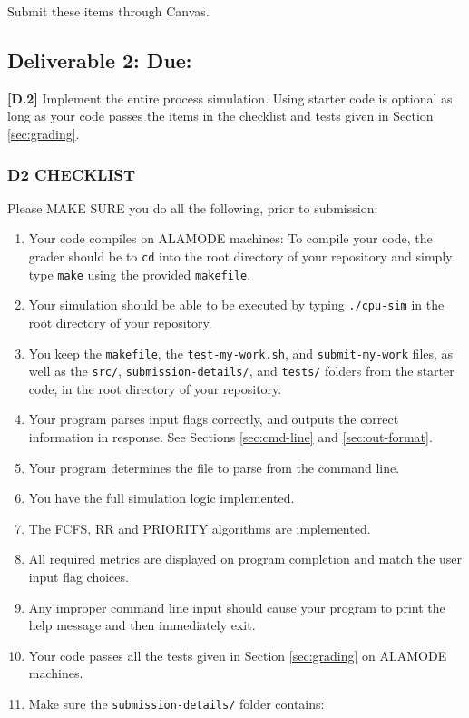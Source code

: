 \documentclass[main.tex]{subfiles}
\begin{document}
Submit these items through Canvas.

\subsection{Deliverable 2: Due: \dtwodate}
\textbf{[D.2]} Implement the entire process simulation. Using starter code is optional as long as your code passes the items in the checklist and tests given in Section \ref{sec:grading}.
\subsubsection{D2 CHECKLIST}
Please MAKE SURE you do all the following, prior to submission:
\begin{enumerate}
    \item Your code compiles on ALAMODE machines: To compile your code, the grader should be to \texttt{cd} into the root directory of your repository and simply type \texttt{make} using the provided \texttt{makefile}.
    \item Your simulation should be able to be executed by typing \texttt{./cpu-sim} in the root directory of your repository.
    \item You keep the \texttt{makefile}, the \texttt{test-my-work.sh}, and \texttt{submit-my-work} files, as well as the \texttt{src/}, \texttt{submission-details/}, and \texttt{tests/} folders from the starter code, in the root directory of your repository.
    \item Your program parses input flags correctly, and outputs the correct information in response. See Sections \ref{sec:cmd-line} and \ref{sec:out-format}.
    \item Your program determines the file to parse from the command line.
    \item You have the full simulation logic implemented.
    \item The FCFS, RR and PRIORITY algorithms are implemented.
    \item All required metrics are displayed on program completion and match the user input flag choices.
    \item Any improper command line input should cause your program to print the help message and then immediately exit.
    \item Your code passes all the tests given in Section \ref{sec:grading} on ALAMODE machines.
    \item Make sure the \texttt{submission-details/} folder contains:
    \begin{itemize}

\end{itemize}
\end{enumerate}
\end{document}
